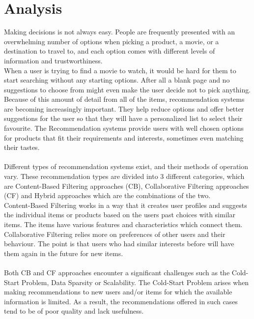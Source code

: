 \documentclass[10pt,oneside,english,a4paper]{article}
\begin{document}
\section{Analysis}
Making decisions is not always easy. People are frequently presented with an overwhelming number of options when picking a product, a movie, or a destination to travel to, and each option comes with different levels of information and trustworthiness. \\
When a user is trying to find a movie to watch, it would be hard for them to start searching without any starting options. After all a blank page and no suggestions to choose from might even make the user decide not to pick anything. \\ 
Because of this amount of detail from all of the items, recommendation systems are becoming increasingly important. They help reduce options and offer better suggestions for the user so that they will have a personalized list to select their favourite. The Recommendation systems provide users with well chosen options for products that fit their requirements and interests, sometimes even matching their tastes.\\\\
Different types of recommendation systems exist, and their methods of operation vary. These recommendation types are divided into 3 different categories, which are Content-Based Filtering approaches (CB), Collaborative Filtering approaches (CF) and Hybrid approaches which are the combinations of the two.\\
Content-Based Filtering works in a way that it creates user profiles and suggests the individual items or products based on the users past choices with similar items. The items have various features and characteristics which connect them.
Collaborative Filtering relies more on preferences of other users and their behaviour. The point is that users who had similar interests before will have them again in the future for new items.\\\\
Both CB and CF approaches encounter a significant challenges such as the Cold-Start Problem, Data Sparsity or Scalability. The Cold-Start Problem arises when making recommendations to new users and/or items for which the available information is limited. As a result, the recommendations offered in such cases tend to be of poor quality and lack usefulness.\cite{Al-Hassan2024a}\\\\
%
\end{document}
